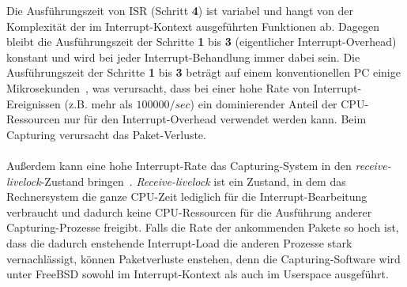 {Die Ausführungszeit von ISR (Schritt \textbf{4}) ist variabel und hangt von der
Komplexität der im Interrupt-Kontext ausgeführten Funktionen ab.  Dagegen
bleibt die Ausführungszeit der Schritte \textbf{1} bis \textbf{3}
(eigentlicher Interrupt-Overhead)  konstant und wird bei jeder
Interrupt-Behandlung immer dabei sein.  Die Ausführungszeit der Schritte
\textbf{1} bis \textbf{3} beträgt auf einem konventionellen PC einige
Mikrosekunden~\cite{intrr_coal}, was verursacht, dass bei einer hohe Rate von
Interrupt-Ereignissen (z.B. mehr als $100 000/sec$) ein dominierender Anteil
der CPU-Ressourcen nur für den Interrupt-Overhead verwendet werden kann.
Beim Capturing verursacht das Paket-Verluste.\\\\
%
Außerdem kann eine hohe Interrupt-Rate das Capturing-System in den
\emph{receive-livelock}-Zustand bringen~\cite{elim_recv_lock}.
\emph{Receive-livelock} ist ein Zustand, in dem das Rechnersystem die ganze
CPU-Zeit lediglich für die Interrupt-Bearbeitung verbraucht und dadurch keine
CPU-Ressourcen für die Ausführung anderer Capturing-Prozesse freigibt. Falls die
Rate der ankommenden Pakete so hoch ist, dass die dadurch enstehende
Interrupt-Load die anderen Prozesse stark vernachlässigt, können 
Paketverluste enstehen, denn die Capturing-Software wird unter FreeBSD sowohl im
Interrupt-Kontext als auch im Userspace ausgeführt.

}
